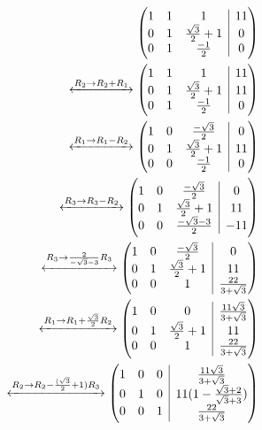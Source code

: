 \documentclass[10pt]{article}
\makeatletter
\newenvironment{amatrix}[1]{%
 \left(\begin{array}{@{}*{#1}{c}|c@{}}
}{%
 \end{array}\right)
}
\newcommand{\myaugvec}[2]{\ensuremath{\begin{amatrix}{#1}#2\end{amatrix}}}
\makeatother
\begin{document}
\begin{align}
     \myaugvec{3}{1 & 1 & 1 & 11\\ 0 & 1 & \frac{\sqrt{3}}{2}+1 & 0\\0 &  1 & \frac{-1}{2} & 0} \\
     \xleftrightarrow[]{R_2 \rightarrow R_2+R_1}\myaugvec{3}{1 & 1 & 1 & 11\\ 0 & 1 & \frac{\sqrt{3}}{2}+1 & 11\\ 0 &  1 & \frac{-1}{2} & 0}\\
    \xleftrightarrow[]{R_1 \rightarrow R_1-R_2}\myaugvec{3}{1 & 0 & \frac{-\sqrt{3}}{2} & 0\\0 & 1 & \frac{\sqrt{3}}{2}+1 & 11\\0 &  0 & \frac{-1}{2} & 0}\\
    \xleftrightarrow[]{R_3 \rightarrow R_3-R_2}\myaugvec{3}{1 & 0 & \frac{-\sqrt{3}}{2} & 0\\0 & 1 & \frac{\sqrt{3}}{2}+1 & 11\\0 &  0 & \frac{-\sqrt{3}-3}{2} & -11}\\
    \xleftrightarrow[]{R_3 \rightarrow \frac{2}{-\sqrt{3}-3} R_3}\myaugvec{3}{1 & 0 & \frac{-\sqrt{3}}{2} & 0\\0 & 1 & \frac{\sqrt{3}}{2}+1 & 11 \\0 &  0 & 1 & \frac{22}{3+\sqrt{3}}}\\
    \xleftrightarrow[]{R_1 \rightarrow R_1+\frac{\sqrt{3}}{2}R_2}\myaugvec{3}{1 & 0 & 0 & \frac{11\sqrt{3}}{3+\sqrt{3}} \\ 0 & 1 & \frac{\sqrt{3}}{2}+1 & 11\\0 &  0 & 1 & \frac{22}{3+\sqrt{3}} }\\
    \xleftrightarrow[]{R_2 \rightarrow R_2-\frac{(\sqrt{3}}{2}+1)R_3}\myaugvec{3}{1 & 0 & 0 & \frac{11\sqrt{3}}{3+\sqrt{3}} \\ 0 & 1 & 0 & 11(1-\frac{\sqrt{3}+2}{\sqrt{3}+3})\\0 &  0 & 1 & \frac{22}{3+\sqrt{3}}}
 \end{align} 
\end{document}

